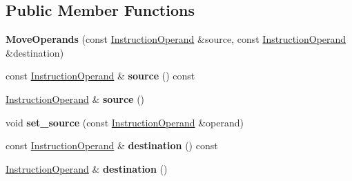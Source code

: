 \subsection*{Public Member Functions}
\begin{DoxyCompactItemize}
\item 
{\bfseries Move\+Operands} (const \hyperlink{classv8_1_1internal_1_1compiler_1_1_instruction_operand}{Instruction\+Operand} \&source, const \hyperlink{classv8_1_1internal_1_1compiler_1_1_instruction_operand}{Instruction\+Operand} \&destination)\hypertarget{classv8_1_1internal_1_1compiler_1_1_move_operands_a1ae5e352302e69cd45bd33dacbd2895a}{}\label{classv8_1_1internal_1_1compiler_1_1_move_operands_a1ae5e352302e69cd45bd33dacbd2895a}

\item 
const \hyperlink{classv8_1_1internal_1_1compiler_1_1_instruction_operand}{Instruction\+Operand} \& {\bfseries source} () const \hypertarget{classv8_1_1internal_1_1compiler_1_1_move_operands_a048807fff8b29a87a0b7e5e9dcd9ebfa}{}\label{classv8_1_1internal_1_1compiler_1_1_move_operands_a048807fff8b29a87a0b7e5e9dcd9ebfa}

\item 
\hyperlink{classv8_1_1internal_1_1compiler_1_1_instruction_operand}{Instruction\+Operand} \& {\bfseries source} ()\hypertarget{classv8_1_1internal_1_1compiler_1_1_move_operands_a9d8da98e2f257e6082e71dbd4af879a9}{}\label{classv8_1_1internal_1_1compiler_1_1_move_operands_a9d8da98e2f257e6082e71dbd4af879a9}

\item 
void {\bfseries set\+\_\+source} (const \hyperlink{classv8_1_1internal_1_1compiler_1_1_instruction_operand}{Instruction\+Operand} \&operand)\hypertarget{classv8_1_1internal_1_1compiler_1_1_move_operands_aff79a4dbeb36b580d0928f21bb281e73}{}\label{classv8_1_1internal_1_1compiler_1_1_move_operands_aff79a4dbeb36b580d0928f21bb281e73}

\item 
const \hyperlink{classv8_1_1internal_1_1compiler_1_1_instruction_operand}{Instruction\+Operand} \& {\bfseries destination} () const \hypertarget{classv8_1_1internal_1_1compiler_1_1_move_operands_af9baf8f06cda1d861e292dfd3eecd1a9}{}\label{classv8_1_1internal_1_1compiler_1_1_move_operands_af9baf8f06cda1d861e292dfd3eecd1a9}

\item 
\hyperlink{classv8_1_1internal_1_1compiler_1_1_instruction_operand}{Instruction\+Operand} \& {\bfseries destination} ()\hypertarget{classv8_1_1internal_1_1compiler_1_1_move_operands_aa554b81587468e00d03b44e5ef1bf0d4}{}\label{classv8_1_1internal_1_1compiler_1_1_move_operands_aa554b81587468e00d03b44e5ef1bf0d4}


\end{DoxyCompactItemize}
